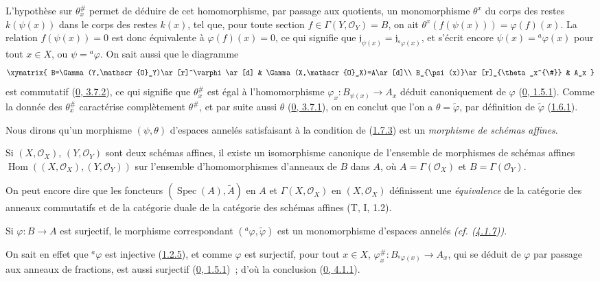 L'hypothèse sur $\theta_x^{\#}$ permet de déduire de cet homomorphisme, par
passage aux quotients, un monomorphisme $\theta^x$ du corps des restes
$k(\psi(x))$ dans le corps des restes $k(x)$, tel que, pour toute section
$f\in\Gamma(Y,\mathscr{O}_Y)=B$, on ait
$\theta^x(f(\psi(x)))=\varphi(f)(x)$. La relation $f(\psi(x))=0$ est donc
équivalente à $\varphi(f)(x)=0$, ce qui signifie que
$\mathfrak{j}_{\psi(x)}=\mathfrak{j}_{{}^a\varphi(x)}$, et s'écrit encore
$\psi(x)={}^a\varphi(x)$ pour tout $x\in X$, ou $\psi={}^a\varphi$. On sait
aussi que le diagramme
\label{I.1.7.3.diagram-fr}
\[
  \xymatrix{
    B=\Gamma(Y,\mathscr{O}_Y)\ar[r]^\varphi\ar[d] &
    \Gamma(X,\mathscr{O}_X)=A\ar[d]\\
    B_{\psi(x)}\ar[r]_{\theta_x^{\#}} & A_x
  }
\]
est commutatif (\hyperref[0.3.7.2-fr]{0, 3.7.2}), ce qui signifie que
$\theta_x^{\#}$ est égal à l'homomorphisme
$\varphi_x:B_{\psi(x)}\to A_x$ déduit canoniquement de $\varphi$
(\hyperref[0.1.5.1-fr]{0, 1.5.1}). Comme la donnée des $\theta_x^{\#}$
caractérise complètement $\theta^{\#}$, et par suite aussi $\theta$
(\hyperref[0.3.7.1-fr]{0, 3.7.1}), on en conclut que l'on a
$\theta=\widetilde\varphi$, par définition de $\widetilde\varphi$
(\hyperref[I.1.6.1-fr]{1.6.1}).

Nous dirons qu'un morphisme $(\psi,\theta)$ d'espaces annelés satisfaisant à
la condition de (\hyperref[I.1.7.3-fr]{1.7.3}) est un \emph{morphisme de
schémas affines}.

\begin{corollary}[1.7.4]
\label{I.1.7.4-fr}
Si $(X,\mathscr{O}_X)$, $(Y,\mathscr{O}_Y)$ sont deux schémas affines, il
existe un isomorphisme canonique de l'ensemble de morphismes de schémas
affines
$\operatorname{Hom}((X,\mathscr{O}_X),(Y,\mathscr{O}_Y))$ sur l'ensemble
d'homomorphismes d'anneaux de $B$ dans $A$, où
$A=\Gamma(\mathscr{O}_X)$ et $B=\Gamma(\mathscr{O}_Y)$.
\end{corollary}

On peut encore dire que les foncteurs $(\operatorname{Spec}(A),\widetilde A)$
en $A$ et $\Gamma(X,\mathscr{O}_X)$ en $(X,\mathscr{O}_X)$ définissent une
\emph{équivalence} de la catégorie des anneaux commutatifs et de la catégorie
duale de la catégorie des schémas affines (T, I, 1.2).

\begin{corollary}[1.7.5]
\label{I.1.7.5-fr}
Si $\varphi:B\to A$ est surjectif, le morphisme correspondant
$({}^a\varphi,\widetilde\varphi)$ est un monomorphisme d'espaces annelés
\emph{(cf. (\hyperref[I.4.1.7-fr]{4.1.7}))}.
\end{corollary}

On sait en effet que ${}^a\varphi$ est injective
(\hyperref[I.1.2.5-fr]{1.2.5}), et comme $\varphi$ est surjectif, pour tout
$x\in X$, $\varphi_x^{\#}:B_{{}^a\varphi(x)}\to A_x$, qui se déduit de
$\varphi$ par passage aux anneaux de fractions, est aussi surjectif
(\hyperref[0.1.5.1-fr]{0, 1.5.1})~; d'où la conclusion
(\hyperref[0.4.1.1-fr]{0, 4.1.1}).
